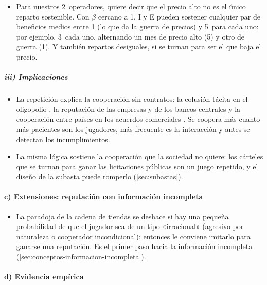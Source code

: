\documentclass[11pt]{article}
\begin{document}
\begin{itemize}
  \begin{itemize}
  \item Para nuestros 2~operadores, quiere decir que el precio alto no es el único reparto sostenible. Con $\beta$ cercano a 1, \textup{I} y E pueden sostener cualquier par de beneficios medios entre 1 (lo que da la guerra de precios) y 5~para cada uno: por ejemplo, 3~cada uno, alternando un mes de precio alto (5) y otro de guerra (1). Y también repartos desiguales, si se turnan para ser el que baja el precio.
  \end{itemize}
\end{itemize}



\subparagraph{iii) Implicaciones}

\begin{itemize}
\item La repetición explica la cooperación sin contratos: la colusión tácita en el oligopolio , la reputación de las empresas y de los bancos centrales  y la cooperación entre países en los acuerdos comerciales . Se coopera más cuanto más pacientes son los jugadores, más frecuente es la interacción y antes se detectan los incumplimientos.
\item La misma lógica sostiene la cooperación que la sociedad no quiere: los cárteles que se turnan para ganar las licitaciones públicas son un juego repetido, y el diseño de la subasta puede romperlo (\ref{sec:subastas}).
\end{itemize}

\paragraph{c) Extensiones: reputación con información incompleta}

\begin{itemize}
\item La paradoja de la cadena de tiendas se deshace si hay una pequeña probabilidad de que el jugador sea de un tipo «irracional» (agresivo por naturaleza o cooperador incondicional): entonces le conviene imitarlo para ganarse una reputación\nocite{KrepsMilgromRobertsWilson1982Rational,KrepsWilson1982Reputation,MilgromRoberts1982Predation}. Es el primer paso hacia la información incompleta (\ref{sec:conceptos-informacion-incompleta}).
\end{itemize}

\paragraph{d) Evidencia empírica}
\end{document}
